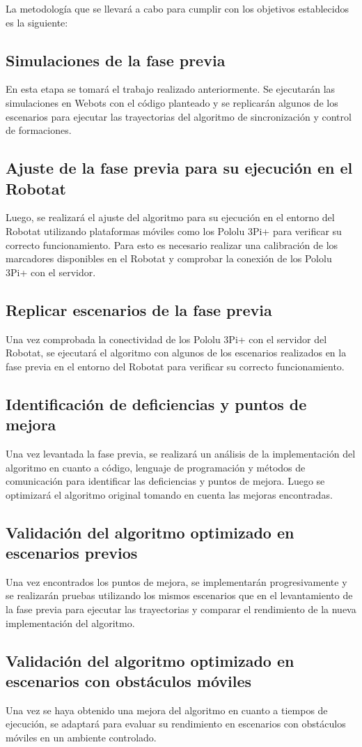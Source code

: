 La metodología que se llevará a cabo para cumplir con los objetivos establecidos es la siguiente:

\subsection*{Simulaciones de la fase previa}
En esta etapa se tomará el trabajo realizado anteriormente. Se ejecutarán las simulaciones en Webots con el código planteado y se replicarán algunos de los escenarios para ejecutar las trayectorias del algoritmo de sincronización y control de formaciones.

\subsection*{Ajuste de la fase previa para su ejecución en el Robotat}
Luego, se realizará el ajuste del algoritmo para su ejecución en el entorno del Robotat utilizando plataformas móviles como los Pololu 3Pi+ para verificar su correcto funcionamiento. Para esto es necesario realizar una calibración de los marcadores disponibles en el Robotat y comprobar la conexión de los Pololu 3Pi+ con el servidor.

\subsection*{Replicar escenarios de la fase previa}
Una vez comprobada la conectividad de los Pololu 3Pi+ con el servidor del Robotat, se ejecutará el algoritmo con algunos de los escenarios realizados en la fase previa en el entorno del Robotat para verificar su correcto funcionamiento.

\subsection*{Identificación de deficiencias y puntos de mejora}
Una vez levantada la fase previa, se realizará un análisis de la implementación del algoritmo en cuanto a código, lenguaje de programación y métodos de comunicación para identificar las deficiencias y puntos de mejora. Luego se optimizará el algoritmo original tomando en cuenta las mejoras encontradas.

\subsection*{Validación del algoritmo optimizado en escenarios previos}
Una vez encontrados los puntos de mejora, se implementarán progresivamente y se realizarán pruebas utilizando los mismos escenarios que en el levantamiento de la fase previa para ejecutar las trayectorias y comparar el rendimiento de la nueva implementación del algoritmo.

\subsection*{Validación del algoritmo optimizado en escenarios con obstáculos móviles}
Una vez se haya obtenido una mejora del algoritmo en cuanto a tiempos de ejecución, se adaptará para evaluar su rendimiento en escenarios con obstáculos móviles en un ambiente controlado.
